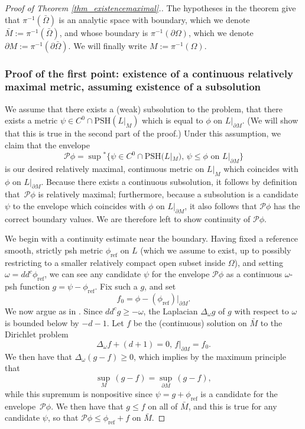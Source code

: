\documentclass[JEP,XML,SOM,Unicode,NoEqCountersInSection,published]{cedram}
\theoremstyle{definition}
\newcommand\cP{\mathcal{P}}
\newcommand\mi{^{-1}}
\newcommand\PSH{\mathrm{PSH}}
\newcommand\refmetric{\phi_{\mathrm{ref}}}
\begin{document}
\begin{proof}[Proof of Theorem \ref{thm_existencemaximal}.] The hypotheses in the theorem give that $\pi\mi(\bar \Omega)$ is an analytic space with boundary, which we denote $\bar M:=\pi\mi(\bar \Omega)$, and whose boundary is $\pi\mi(\partial \Omega)$, which we denote $\partial M:=\pi\mi(\partial\bar \Omega)$. We will finally write $M:=\pi\mi(\Omega)$.

\subsubsection*{Proof of the first point: existence of a continuous relatively maximal metric, assuming exis\-tence of a subsolution}
We assume that there exists a (weak) subsolution to the problem, \ie that there exists a metric $\psi\in C^0\cap \PSH(L|_M)$ which is equal to $\phi$ on $L|_{\partial M}$. (We will show that this is true in the second part of the proof.) Under this assumption, we claim that the envelope
\[
\cP \phi=\sup{}^*\{\psi\in C^0\cap \PSH(L|_M),\,\psi\leq\phi\text{ on }L|_{\partial M}\}
\]
is our desired relatively maximal, continuous metric on $L|_M$ which coincides with~$\phi$ on $L|_{\partial M}$. Because there exists a continuous subsolution, it follows by definition that~$\cP \phi$ is relatively maximal; furthermore, because a subsolution is a candidate $\psi$ to the envelope which coincides with $\phi$ on $L|_{\partial M}$, it also follows that $\cP\phi$ has the correct boundary values. We are therefore left to show continuity of $\cP\phi$.

We begin with a continuity estimate near the boundary. Having fixed a reference smooth, strictly psh metric $\refmetric$ on $L$ (which we assume to exist, up to possibly restricting to a smaller relatively compact open subset inside $\Omega$), and setting $\omega=dd^c\refmetric$, we can see any candidate $\psi$ for the envelope $\cP\phi$ as a continuous $\omega$-psh function $g=\psi-\refmetric$. Fix such a $g$, and set
\[
f_0=\phi-(\refmetric)|_{\partial M}.
\]
We now argue as in \cite[\S 4.2(a)]{phongsturmeq}. Since $dd^c g\geq -\omega$, the Laplacian $\Delta_\omega g$ of $g$ with respect to $\omega$ is bounded below by $-d-1$. Let $f$ be the (continuous) solution on $\bar M$ to the Dirichlet problem
\[
\Delta_\omega f +(d+1) = 0,\,f|_{\partial M}=f_0.
\]
We then have that $\Delta_\omega(g-f)\geq 0$, which implies by the maximum principle that
\[
\sup_{M} \,(g-f) = \sup_{\partial M}\,(g-f),
\]
while this supremum is nonpositive since $\psi=g+\refmetric$ is a candidate for the envelope~$\cP\phi$. We then have that $g\leq f$ on all of $\bar M$, and this is true for any candidate $\psi$, so that $\cP\phi\leq \refmetric + f$ on $\bar M$.


\end{proof}
\end{document}
